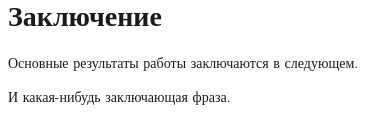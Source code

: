 \chapter*{Заключение}						%


Основные результаты работы заключаются в следующем.

И какая-нибудь заключающая фраза.
